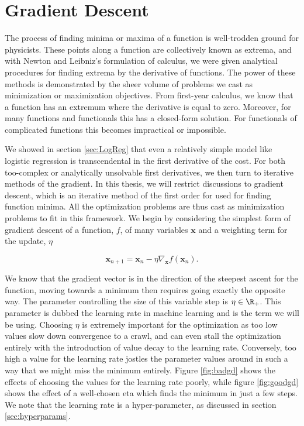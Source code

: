 \section{Gradient Descent}\label{sec:gd}

The process of finding minima or maxima of a function is well-trodden ground for physicists. These points along a function are collectively known as extrema, and with Newton and Leibniz's formulation of calculus, we were given analytical procedures for finding extrema by the derivative of functions. The power of these methods is demonstrated by the sheer volume of problems we cast as minimization or maximization objectives. From first-year calculus, we know that a function has an extremum where the derivative is equal to zero. Moreover, for many functions and functionals this has a closed-form solution. For functionals of complicated functions this becomes impractical or impossible. 

We showed in section \ref{sec:LogReg} that even a relatively simple model like logistic regression is transcendental in the first derivative of the cost. For both too-complex or analytically unsolvable first derivatives, we then turn to iterative methods of the gradient. In this thesis, we will restrict discussions to gradient descent, which is an iterative method of the first order for used for finding function minima. All the optimization problems are thus cast as minimization problems to fit in this framework. We begin by considering the simplest form of gradient descent of a function, $f$, of many variables $\boldsymbol{x}$ and a weighting term for the update, $\eta$

\begin{equation}\label{eq:gd}
\boldsymbol{x}_{n+1} = \boldsymbol{x}_{n} - \eta \nabla_{\boldsymbol{x}} f(\boldsymbol{x}_{n}). 
\end{equation} 

\noindent We know that the gradient vector is in the direction of the steepest ascent for the function, moving towards a minimum then requires going exactly the opposite way. The parameter controlling the size of this variable step is  $\eta \in \R_+$. This parameter is dubbed the learning rate in machine learning and is the term we will be using. Choosing $\eta$ is extremely important for the optimization as too low values slow down convergence to a crawl, and can even stall the optimization entirely with the introduction of value decay to the learning rate. Conversely, too high a value for the learning rate jostles the parameter values around in such a way that we might miss the minimum entirely. Figure \ref{fig:badgd} shows the effects of choosing the values for the learning rate poorly, while figure \ref{fig:goodgd} shows the effect of a well-chosen eta which finds the minimum in just a few steps. We note that the learning rate is a hyper-parameter, as discussed in section \ref{sec:hyperparams}. 


